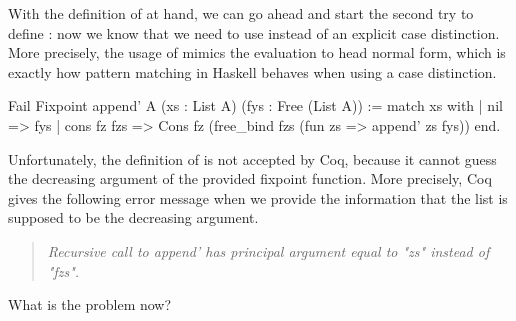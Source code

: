With the definition of  at hand, we can go ahead and start the second try to define : now we know that we need to use  instead of an explicit case distinction.
More precisely, the usage of  mimics the evaluation to head normal form, which is exactly how pattern matching in Haskell behaves when using a case distinction.

\begin{coqcode}
Fail Fixpoint append' A (xs : List A) (fys : Free (List A)) :=
  match xs with
  | nil         => fys
  | cons fz fzs => Cons fz (free_bind fzs (fun zs => append' zs fys))
  end.
\end{coqcode}

Unfortunately, the definition of  is not accepted by Coq, because it cannot guess the decreasing argument of the provided fixpoint function.
More precisely, Coq gives the following error message when we provide the information that the list  is supposed to be the decreasing argument.

\begin{quote}
\emph{Recursive call to append' has principal argument equal to "zs" instead of "fzs".}
\end{quote}

What is the problem now?

